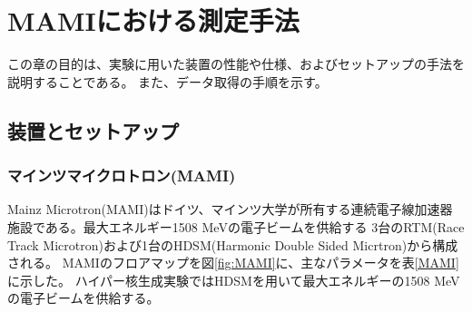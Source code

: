 \documentclass[a4paper,11pt,uplatex]{jsbook}
\begin{document}
\chapter{MAMIにおける測定手法}
この章の目的は、実験に用いた装置の性能や仕様、およびセットアップの手法を説明することである。
また、データ取得の手順を示す。
\section{装置とセットアップ}
\subsection{マインツマイクロトロン(MAMI)}
Mainz Microtron(MAMI)はドイツ、マインツ大学が所有する連続電子線加速器施設である。最大エネルギー1508 MeVの電子ビームを供給する
3台のRTM(Race Track Microtron)および1台のHDSM(Harmonic Double Sided Micrtron)から構成される。
MAMIのフロアマップを図\ref{fig:MAMI}に、主なパラメータを表\ref{MAMI}に示した。
ハイパー核生成実験ではHDSMを用いて最大エネルギーの1508 MeVの電子ビームを供給する。
\end{document}
